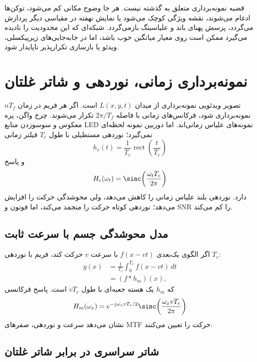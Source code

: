 \begin{futurebox}
قضیه نمونه‌برداری متعلق به گذشته نیست. هر جا وضوح مکانی کم می‌شود، توکن‌ها ادغام می‌شوند،
نقشه ویژگی کوچک می‌شود یا نمایش نهفته در مقیاسی دیگر پردازش می‌گردد، پرسش پهنای باند و علیاسینگ
بازمی‌گردد. شبکه‌ای که این محدودیت را نادیده می‌گیرد ممکن است روی معیار میانگین خوب باشد، اما در
جابه‌جایی‌های زیرپیکسلی، ویدئو یا بازسازی تکرارپذیر ناپایدار شود.
\end{futurebox}


\section{نمونه‌برداری زمانی، نوردهی و شاتر غلتان}

تصویر ویدئویی نمونه‌برداری از میدان \(L(x,y,t)\) است. اگر هر فریم در زمان \(nT_f\) نمونه‌برداری
شود، فرکانس‌های زمانی با فاصله \(2\pi/T_f\) تکرار می‌شوند. چرخ واگن، پره معکوس و سوسوزدن منابع
LED نمونه‌های علیاس زمانی‌اند. اما دوربین نمونه لحظه‌ای نمی‌گیرد؛ نوردهی مستطیلی با طول \(T_e\)
فیلتر زمانی
\begin{equation}
h_e(t)=\frac1{T_e}\operatorname{rect}\!\left(\frac{t}{T_e}\right)
\end{equation}
و پاسخ
\begin{equation}
H_e(\omega_t)=\sinc\!\left(\frac{\omega_tT_e}{2\pi}\right)
\end{equation}
دارد. نوردهی بلند علیاس زمانی را کاهش می‌دهد، ولی محوشدگی حرکت را افزایش می‌دهد؛ نوردهی کوتاه
حرکت را منجمد می‌کند، اما فوتون و SNR را کم می‌کند.

\subsection{مدل محوشدگی جسم با سرعت ثابت}

اگر الگوی یک‌بعدی \(f(x-vt)\) با سرعت \(v\) حرکت کند، فریم با نوردهی \(T_e\):
\begin{align}
y(x)&=\frac1{T_e}\int_0^{T_e}f(x-vt)\,dt\\
&=(f*h_m)(x),
\end{align}
که \(h_m\) یک هسته جعبه‌ای با طول \(vT_e\) است. پاسخ فرکانسی
\begin{equation}
H_m(\omega_x)=e^{-j\omega_xvT_e/2}
\sinc\!\left(\frac{\omega_xvT_e}{2\pi}\right)
\end{equation}
نشان می‌دهد سرعت و نوردهی، صفرهای MTF حرکت را تعیین می‌کنند.

\subsection{شاتر سراسری در برابر شاتر غلتان}

